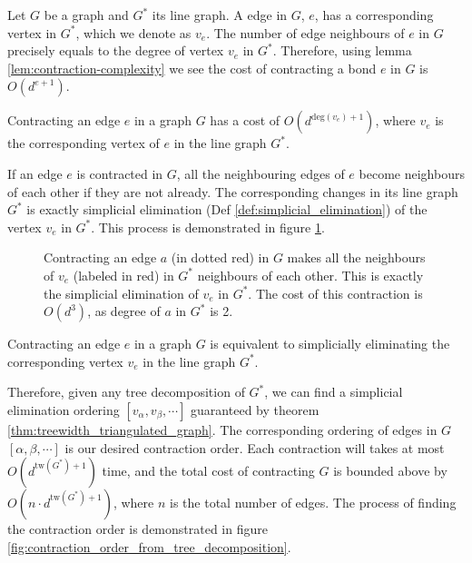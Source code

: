 Let $G$ be a graph and $G^*$ its line graph.
A edge in $G$, $e$, has a corresponding vertex in $G^*$, which we denote as $v_e$.
The number of edge neighbours of $e$ in $G$ precisely equals to the degree of vertex $v_e$ in $G^*$.
Therefore, using lemma \ref{lem:contraction-complexity} we see the cost of contracting a bond $e$ in $G$ is $O(d^{e+1})$.
\begin{lemma}\label{lem:contraction-complexity-vertex-order}
	Contracting an edge $e$ in a graph $G$ has a cost of $O(d^{\text{deg}(v_e) + 1})$, where $v_e$ is the corresponding vertex of $e$ in the line graph $G^*$.
\end{lemma}

If an edge $e$ is contracted in $G$, all the neighbouring edges of $e$ become neighbours of each other if they are not already.
The corresponding changes in its line graph $G^*$ is exactly simplicial elimination (Def \ref{def:simplicial_elimination}) of the vertex $v_e$ in $G^*$.
This process is demonstrated in figure \ref{fig:line_graph_simplicial_elimination}.
\begin{figure}[ht]
	\centering
	\resizebox{0.7\textwidth}{!}{
		
	}
	\caption{Contracting an edge $a$ (in dotted red) in $G$ 
			makes all the neighbours of $v_e$ (labeled in red) in $G^*$ neighbours of each other. This is exactly the simplicial elimination of $v_e$ in $G^*$.
			The cost of this contraction is $O(d^{3})$, as degree of $a$ in $G^*$ is 2.
		}
	\label{fig:line_graph_simplicial_elimination}
\end{figure}

\begin{lemma}\label{lem:contracting-makes-neighbours}
	Contracting an edge $e$ in a graph $G$ is equivalent to simplicially eliminating the corresponding vertex $v_e$ in the line graph $G^*$.
\end{lemma}

Therefore, given any tree decomposition of $G^*$, we can find a simplicial elimination ordering $[v_{\alpha}, v_{\beta}, \cdots ]$ guaranteed by theorem \ref{thm:treewidth_triangulated_graph}.
The corresponding ordering of edges in $G$ $[\alpha, \beta, \cdots]$ is our desired contraction order. 
Each contraction will takes at most $O(d^{\text{tw}(G^*) + 1})$ time, and the total cost of contracting $G$ is bounded above by $O(n \cdot d^{\text{tw}(G^*) + 1})$, where $n$ is the total number of edges.
The process of finding the contraction order is demonstrated in figure \ref{fig:contraction_order_from_tree_decomposition}.

